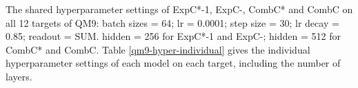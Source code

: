 \documentclass{article} \usepackage{iclr2021_conference,times}
\begin{document}
\begin{table}[h]
\centering
\caption{Hyperparameter settings for TU.}\smallskip
{}
\label{ogbg-hyperparaeters}
\end{table}

The shared hyperparameter settings of ExpC*-1, ExpC-, CombC* and CombC on all 12 targets of QM9:
batch sizes = 64;
lr = 0.0001;
step size = 30;
lr decay = 0.85;
readout = SUM.
hidden = 256 for ExpC*-1 and ExpC-;
hidden = 512 for CombC* and CombC.
Table \ref{qm9-hyper-individual} gives the individual hyperparameter settings of each model on each target,
including the number of layers.
\end{document}
